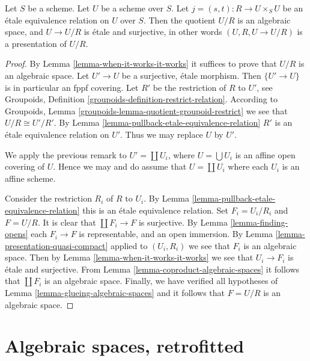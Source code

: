 \begin{theorem}
\label{theorem-presentation}
Let $S$ be a scheme. Let $U$ be a scheme over $S$.
Let $j = (s, t) : R \to U \times_S U$
be an \'etale equivalence relation on $U$ over $S$.
Then the quotient $U/R$ is an algebraic space,
and $U \to U/R$ is \'etale and surjective, in other words
$(U, R, U \to U/R)$ is a presentation of $U/R$.
\end{theorem}

\begin{proof}
By Lemma \ref{lemma-when-it-works-it-works}
it suffices to prove that $U/R$ is an algebraic space.
Let $U' \to U$ be a surjective, \'etale morphism.
Then $\{U' \to U\}$ is in particular an fppf covering.
Let $R'$ be the restriction of $R$ to $U'$, see
Groupoids, Definition \ref{groupoids-definition-restrict-relation}.
According to
Groupoids, Lemma \ref{groupoids-lemma-quotient-groupoid-restrict}
we see that $U/R \cong U'/R'$.
By Lemma \ref{lemma-pullback-etale-equivalence-relation} $R'$ is an
\'etale equivalence relation on $U'$. Thus we may replace $U$ by $U'$.

\medskip\noindent
We apply the previous remark to $U' = \coprod U_i$, where
$U = \bigcup U_i$ is an affine open covering of $U$. Hence we
may and do assume that $U = \coprod U_i$ where
each $U_i$ is an affine scheme.

\medskip\noindent
Consider the restriction $R_i$ of $R$ to $U_i$.
By Lemma \ref{lemma-pullback-etale-equivalence-relation}
this is an \'etale equivalence relation.
Set $F_i = U_i/R_i$ and $F = U/R$.
It is clear that $\coprod F_i \to F$ is surjective.
By Lemma \ref{lemma-finding-opens} each $F_i \to F$
is representable, and an open immersion.
By Lemma \ref{lemma-presentation-quasi-compact}
applied to $(U_i, R_i)$ we see that $F_i$ is an algebraic space.
Then by Lemma \ref{lemma-when-it-works-it-works} we see that
$U_i \to F_i$ is \'etale and surjective.
From Lemma \ref{lemma-coproduct-algebraic-spaces}
it follows that $\coprod F_i$ is an algebraic space.
Finally, we have verified all
hypotheses of Lemma \ref{lemma-glueing-algebraic-spaces}
and it follows that $F = U/R$ is an algebraic space.
\end{proof}










\section{Algebraic spaces, retrofitted}
\label{section-algebraic-spaces-retrofitted}

